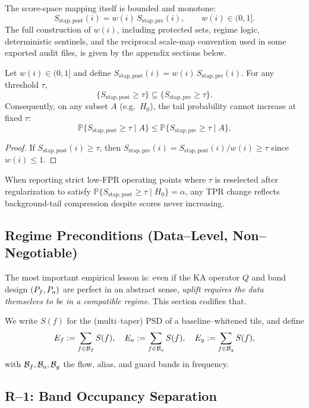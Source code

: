 The score-space mapping itself is bounded and monotone:
\[
  S_{\mathrm{stap,post}}(i)=w(i)\,S_{\mathrm{stap,pre}}(i),\qquad w(i)\in(0,1].
\]
The full construction of $w(i)$, including protected sets, regime logic, deterministic sentinels, and the reciprocal scale-map convention used in some exported audit files, is given by the appendix sections below.

\begin{lemma}
\label{lem:shrink_only_monotonicity}
Let $w(i)\in(0,1]$ and define $S_{\mathrm{stap,post}}(i)=w(i)\,S_{\mathrm{stap,pre}}(i)$. For any threshold $\tau$,
\[
  \{S_{\mathrm{stap,post}}\ge\tau\}\subseteq \{S_{\mathrm{stap,pre}}\ge\tau\}.
\]
Consequently, on any subset $A$ (e.g.\ $H_0$), the tail probability cannot increase at fixed $\tau$:
\[
  \mathbb{P}\{S_{\mathrm{stap,post}}\ge\tau\mid A\}\le \mathbb{P}\{S_{\mathrm{stap,pre}}\ge\tau\mid A\}.
\]
\end{lemma}
\begin{proof}
If $S_{\mathrm{stap,post}}(i)\ge\tau$, then $S_{\mathrm{stap,pre}}(i)=S_{\mathrm{stap,post}}(i)/w(i)\ge\tau$ since $w(i)\le 1$.
\end{proof}

When reporting strict low-FPR operating points where $\tau$ is reselected after regularization to satisfy $\mathbb{P}\{S_{\mathrm{stap,post}}\ge\tau\mid H_0\}=\alpha$, any TPR change reflects background-tail compression despite scores never increasing.

\subsection{Regime Preconditions (Data--Level, Non--Negotiable)}
\label{sec:regime}

The most important empirical lesson is: even if the KA operator $Q$ and band design $(P_f,P_a)$ are perfect in an abstract sense, \emph{uplift requires the data themselves to be in a compatible regime}. This section codifies that.

We write $S(f)$ for the (multi--taper) PSD of a baseline--whitened tile, and define
\[
E_f := \sum_{f\in\mathcal{B}_f} S(f),\quad
E_a := \sum_{f\in\mathcal{B}_a} S(f),\quad
E_g := \sum_{f\in\mathcal{B}_g} S(f),
\]
with $\mathcal{B}_f,\mathcal{B}_a,\mathcal{B}_g$ the flow, alias, and guard bands in frequency.

\subsection{R--1: Band Occupancy Separation}

